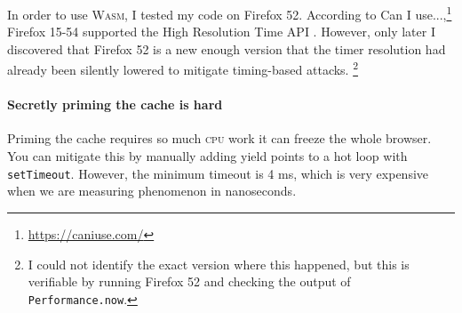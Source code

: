 \documentclass[a4paper,10pt,twocolumn]{article}
\theoremstyle{definition}
\newcommand*{\code}{\texttt}
\newcommand*{\acronym}{\textsc}
\newcommand*{\API}{\acronym{Api}}
\newcommand*{\WASM}{\acronym{Wasm}}
\begin{document}
In order to use \WASM{}, I tested my code on Firefox 52.
According to Can I use...,\footnote{\url{https://caniuse.com/}} Firefox 15-54
supported the High Resolution Time API \parencite{caniuse}.
However, only later I discovered that Firefox 52 is a new enough version that the timer
resolution had already been silently lowered to mitigate timing-based attacks.
\footnote{I could not identify the exact version where this happened, but this
is verifiable by running Firefox 52 and checking the output of
\code{Performance.now}.}

% 


\paragraph{Secretly priming the cache is hard}


Priming the cache requires so much \acronym{cpu} work it can freeze the
whole browser.
You can mitigate this by manually adding yield points to a hot loop with
\code{setTimeout}.
However, the minimum timeout is 4 ms, which is very expensive when we are
measuring phenomenon in nanoseconds.
\end{document}
